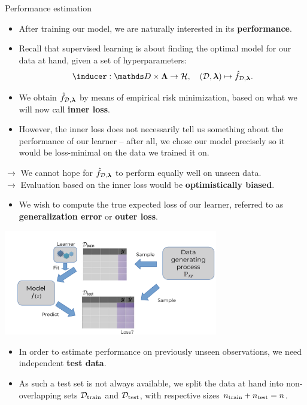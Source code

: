 \begin{vbframe}{Performance estimation}

\begin{itemize}
  \item After training our model, we are naturally interested in its
  \textbf{performance}.
  \item Recall that supervised learning is about finding the optimal model 
  for our data at hand, given a set of hyperparameters: 
  $$\inducer: \preimageInducerShort \rightarrow \Hspace, \quad (\D, \lamv)
  \mapsto \fhDlam.$$
  \item We obtain $\hat{f}_{\mathcal{D}, \bm{\lambda}}$ by means of empirical risk minimization, 
  based on what we will now call \textbf{inner loss}.
  \item However, the inner loss does not necessarily tell us something about the performance 
  of our learner -- after all, we chose our model precisely so it would be 
  loss-minimal on the data we trained it on.
\end{itemize}

\lz
$\rightarrow$ We cannot hope for $\hat{f}_{\mathcal{D}, \bm{\lambda}}$ to perform equally well 
on unseen data. \\
$\rightarrow$ Evaluation based on the inner loss would be 
\textbf{optimistically biased}.

\framebreak

\begin{itemize}
  \item We wish to compute the true expected loss of our learner, referred to as
  \textbf{generalization error} or \textbf{outer loss}.
\end{itemize}

\begin{center}
\includegraphics[trim = 0 0 0 30, clip, width=0.7\textwidth]
{figure_man/evaluation-intro-ge.pdf}
\end{center}

\begin{itemize}
  \item In order to estimate performance on previously unseen observations, we 
  need independent \textbf{test data}. 
  \item As such a test set is not always available, we split the data at hand into non-overlapping sets $\mathcal{D}_{\text{train}}$ and $\mathcal{D}_{\text{test}}$, 
  with respective sizes $n_{\mathrm{train}} + n_{\mathrm{test}} = n$.
\end{itemize}

\end{vbframe}


